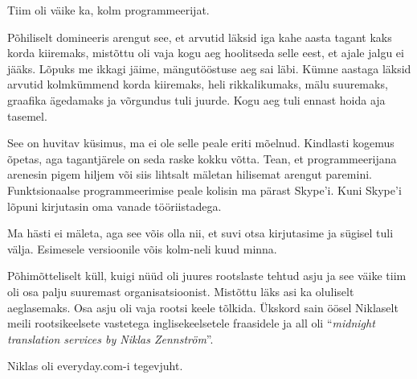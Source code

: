
Tiim oli väike ka, kolm programmeerijat. 


Põhiliselt domineeris arengut see, et arvutid läksid iga 
kahe aasta tagant kaks korda kiiremaks, mistõttu oli vaja kogu aeg hoolitseda 
selle eest, et ajale jalgu ei jääks. Lõpuks me ikkagi jäime, mängutööstuse aeg 
sai läbi. Kümne aastaga läksid arvutid kolmkümmend korda kiiremaks, heli rikkalikumaks, 
mälu suuremaks, graafika ägedamaks ja võrgundus tuli juurde. Kogu aeg tuli 
ennast hoida aja tasemel. 


See on huvitav küsimus, ma ei ole selle peale eriti mõelnud. Kindlasti 
kogemus õpetas, aga tagantjärele on seda raske kokku võtta. 
Tean, et programmeerijana arenesin pigem hiljem või siis lihtsalt mäletan hilisemat arengut paremini. 
Funktsionaalse programmeerimise peale kolisin ma pärast Skype'i. Kuni Skype'i 
lõpuni kirjutasin oma vanade tööriistadega.


Ma hästi ei mäleta, aga see võis olla nii, et suvi otsa kirjutasime ja 
sügisel tuli välja. Esimesele versioonile võis kolm-neli 
kuud minna.


Põhimõtteliselt küll, kuigi nüüd oli juures rootslaste 
tehtud asju ja see väike tiim oli osa palju suuremast organisatsioonist. 
Mistõttu läks asi ka oluliselt aeglasemaks. Osa asju oli vaja rootsi keele 
tõlkida. Ükskord sain öösel Niklaselt meili 
rootsikeelsete vastetega inglisekeelsetele fraasidele ja all oli 
\enquote{\emph{midnight translation services by Niklas Zennström}}.


Niklas oli everyday.com-i tegevjuht. 


